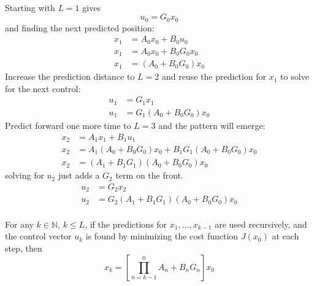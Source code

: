 \documentclass{article}
\begin{document}
\paragraph{}
Starting with $L=1$ gives
\[ \boxed{u_{0} = G_{0} x_{0}} \]
and finding the next predicted position:
\begin{align*}
x_{1} &= A_{0}x_{0} + B_{0}u_{0} \\
x_{1} &= A_{0} x_{0} + B_{0} G_{0} x_{0} \\
x_{1} &= \left( A_{0} + B_{0} G_{0} \right) x_{0}
\end{align*}
Increase the prediction distance to $L=2$ and reuse the prediction for $x_{1}$ to solve for the next control:
\begin{align*}
u_{1} &= G_{1} x_{1} \\
u_{1} &= G_{1} \left( A_{0} + B_{0} G_{0} \right) x_{0}
\end{align*}
Predict forward one more time to $L=3$ and the pattern will emerge:
\begin{align*}
x_{2} &= A_{1}x_{1} + B_{1}u_{1} \\
x_{2} &= A_{1} \left( A_{0} + B_{0} G_{0} \right) x_{0} + B_{1} G_{1} \left( A_{0} + B_{0} G_{0} \right) x_{0} \\
x_{2} &= \left( A_{1} + B_{1} G_{1} \right) \left( A_{0} + B_{0} G_{0} \right) x_{0}
\end{align*}
solving for $u_{2}$ just adds a $G_{2}$ term on the front.
\begin{align*}
u_{2} &= G_{2} x_{2} \\
u_{2} &= G_{2} \left( A_{1} + B_{1} G_{1} \right) \left( A_{0} + B_{0} G_{0} \right) x_{0}
\end{align*}

\paragraph{}
\begin{theorem}
For any $k\in\mathbb{N}$, $k\le L$, if the predictions for $x_{1},\dots,x_{k-1}$ are used recursively, and the control vector $u_{k}$ is found by minimizing the cost function $J(x_{0})$ at each step, then
\[ \boxed{ x_{k} = \left[ \prod_{n=k-1}^{0} A_{n} + B_{n} G_{n} \right] x_{0} } \]
\end{theorem}
\end{document}
